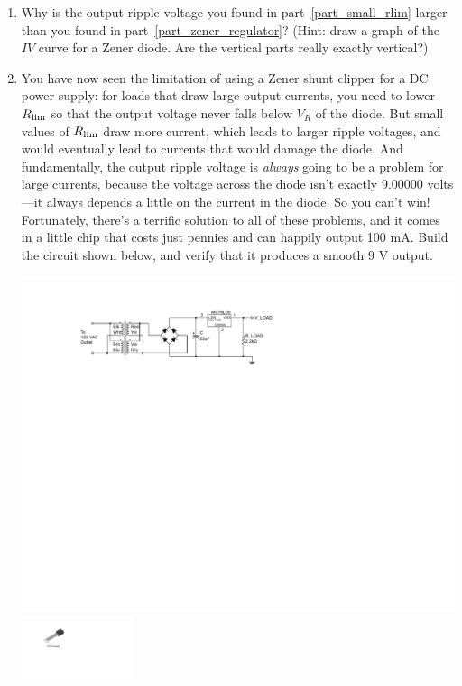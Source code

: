 \begin{enumerate}[wide]
\item Why is the output ripple voltage you found in part~\ref{part_small_rlim} larger than you found in part~\ref{part_zener_regulator}?  (Hint: draw a graph of the $IV$ curve for a Zener diode.  Are the vertical parts really exactly vertical?)

\item You have now seen the limitation of using a Zener shunt clipper for a DC power supply: for loads that draw large output currents, you need to lower $R_{\rm lim}$ so that the output voltage never falls below $V_R$ of the diode.  But small values of $R_{\rm lim}$ draw more current, which leads to larger ripple voltages, and would eventually lead to currents that would damage the diode.  And fundamentally, the output ripple voltage is \textit{always} going to be a problem for large currents, because the voltage across the diode isn't exactly 9.00000 volts---it always depends a little on the current in the diode.  So you can't win!  Fortunately, there's a terrific solution to all of these problems, and it comes in a little chip that costs just pennies and can happily output 100 mA.  Build the circuit shown below, and verify that it produces a smooth 9 V output. \label{part_linear_power_supply_78xx}
\begin{center}
\includegraphics{power_supply/7809_regulator.pdf}
\includegraphics[width=1.3in]{appendices/pinouts/TO-92_package_pinout.pdf}
\end{center}
 

\end{enumerate}
